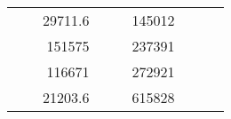 \begin{table}[H]
\begin{tabular}{|ccrccrccc}
\multicolumn{1}{|c|}{\cellcolor[HTML]{FFFFC7}}                                & \multicolumn{1}{c|}{\cellcolor[HTML]{DDFDFF}}                      & \multicolumn{1}{r|}{\cellcolor[HTML]{DAE8FC}29711.6}   & \multicolumn{1}{c|}{\cellcolor[HTML]{FFFFC7}}                                & \multicolumn{1}{c|}{\cellcolor[HTML]{DDFDFF}}                       & \multicolumn{1}{r|}{\cellcolor[HTML]{DDFDFF}145012}    &                                                                              &                                                                    &                                                        \\ \cline{3-3} \cline{6-6}
\multicolumn{1}{|c|}{\cellcolor[HTML]{FFFFC7}}                                & \multicolumn{1}{c|}{\cellcolor[HTML]{DDFDFF}}                      & \multicolumn{1}{r|}{\cellcolor[HTML]{DDFDFF}151575}    & \multicolumn{1}{c|}{\cellcolor[HTML]{FFFFC7}}                                & \multicolumn{1}{c|}{\cellcolor[HTML]{DDFDFF}}                       & \multicolumn{1}{r|}{\cellcolor[HTML]{DAE8FC}237391}    &                                                                              &                                                                    &                                                        \\ \cline{3-3} \cline{6-6}
\multicolumn{1}{|c|}{\cellcolor[HTML]{FFFFC7}}                                & \multicolumn{1}{c|}{\cellcolor[HTML]{DDFDFF}}                      & \multicolumn{1}{r|}{\cellcolor[HTML]{DAE8FC}116671}    & \multicolumn{1}{c|}{\cellcolor[HTML]{FFFFC7}}                                & \multicolumn{1}{c|}{\cellcolor[HTML]{DDFDFF}}                       & \multicolumn{1}{r|}{\cellcolor[HTML]{DDFDFF}272921}    &                                                                              &                                                                    &                                                        \\ \cline{3-3} \cline{6-6}
\multicolumn{1}{|c|}{\cellcolor[HTML]{FFFFC7}}                                & \multicolumn{1}{c|}{\cellcolor[HTML]{DDFDFF}}                      & \multicolumn{1}{r|}{\cellcolor[HTML]{DDFDFF}21203.6}   & \multicolumn{1}{c|}{\cellcolor[HTML]{FFFFC7}}                                & \multicolumn{1}{c|}{\cellcolor[HTML]{DDFDFF}}                       & \multicolumn{1}{r|}{\cellcolor[HTML]{DAE8FC}615828}    &                                                                              &                                                                    &                                                        \\ \cline{3-3} \cline{6-6}

\end{tabular}
\end{table}
